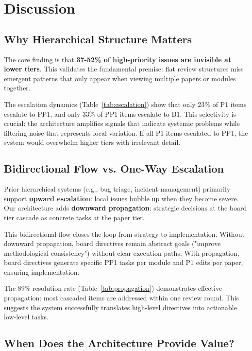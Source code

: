 \section{Discussion}
\label{sec:discussion}

\subsection{Why Hierarchical Structure Matters}

The core finding is that \textbf{37-52\% of high-priority issues are invisible at lower tiers}. This validates the fundamental premise: flat review structures miss emergent patterns that only appear when viewing multiple papers or modules together.

The escalation dynamics (Table~\ref{tab:escalation}) show that only 23\% of P1 items escalate to PP1, and only 33\% of PP1 items escalate to B1. This selectivity is crucial: the architecture amplifies signals that indicate systemic problems while filtering noise that represents local variation. If all P1 items escalated to PP1, the system would overwhelm higher tiers with irrelevant detail.

\subsection{Bidirectional Flow vs. One-Way Escalation}

Prior hierarchical systems (e.g., bug triage, incident management) primarily support \textbf{upward escalation}: local issues bubble up when they become severe. Our architecture adds \textbf{downward propagation}: strategic decisions at the board tier cascade as concrete tasks at the paper tier.

This bidirectional flow closes the loop from strategy to implementation. Without downward propagation, board directives remain abstract goals ("improve methodological consistency") without clear execution paths. With propagation, board directives generate specific PP1 tasks per module and P1 edits per paper, ensuring implementation.

The 89\% resolution rate (Table~\ref{tab:propagation}) demonstrates effective propagation: most cascaded items are addressed within one review round. This suggests the system successfully translates high-level directives into actionable low-level tasks.

\subsection{When Does the Architecture Provide Value?}

